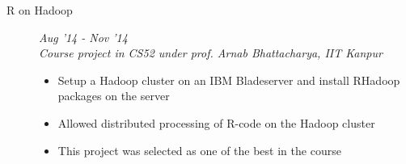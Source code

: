 \documentclass[9pt]{article}
\newenvironment{changemargin}[2]{%
  \begin{list}{}{%
    \setlength{\topsep}{0pt}%
    \setlength{\leftmargin}{#1}%
    \setlength{\rightmargin}{#2}%
    \setlength{\listparindent}{\parindent}%
    \setlength{\itemindent}{\parindent}%
    \setlength{\parsep}{\parskip}%
  }%
  \item[]}{\end{list}
}
\newenvironment{body} {
	\vspace*{-16pt}
	\begin{changemargin}{-0.6in}{-0.65in}
  }	
	{\end{changemargin}
}
\begin{document}
\begin{body}
\begin{description}
	 
	 \item[\normalsize{R on Hadoop}]	\hfill 	\textit{Aug '14 - Nov '14} \\
	 \textit{Course project in CS52 under prof. Arnab Bhattacharya, IIT Kanpur}
	 \begin{itemize}
	  \item Setup a Hadoop cluster on an IBM Bladeserver and install RHadoop packages on the server 
	  \item Allowed distributed processing of R-code on the Hadoop cluster
	  \item This project was selected as one of the best in the course
	 \end{itemize}
 
	 \end{description}
	\smallskip
\end{body}
	  
\end{document}
